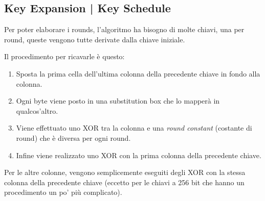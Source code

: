 \fleuron


\subsection{Key Expansion | Key Schedule}

   

\textsf{\small Per poter elaborare i rounds, l'algoritmo ha bisogno di molte chiavi, una per round, queste vengono tutte derivate dalla chiave iniziale.}


\textsf{\small Il procedimento per ricavarle è questo: }

 

\begin{enumerate}
	\item \textsf{\small Sposta la prima cella dell'ultima colonna della precedente chiave in fondo alla colonna.} %
	\item \textsf{\small Ogni byte viene posto in una substitution box che lo mapperà in qualcos'altro.} %
	\item \textsf{\small Viene effettuato uno XOR tra la colonna e una \emph{round constant} (costante di round) che è diversa per ogni round.} %
	\item \textsf{\small Infine viene realizzato uno XOR con la prima colonna della precedente chiave.}
\end{enumerate}


\textsf{\small Per le altre colonne, vengono semplicemente eseguiti degli XOR con la stessa colonna della precedente chiave (eccetto per le chiavi a 256 bit che hanno un procedimento un po' più complicato).} %

